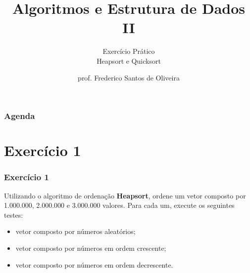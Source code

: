 \documentclass[aspectratio=169]{beamer}
\title[Algoritmos de Ordenação]{Algoritmos e Estrutura de Dados II}
\subtitle{Exercício Prático\\Heapsort e Quicksort}
\author[Frederico Santos de Oliveira]{prof. Frederico Santos de Oliveira}
\institute[UFMT]{Universidade Federal de Mato Grosso\\ Instituto de Engenharia}
\date{}
\begin{document}

\begin{frame}[plain]
  \titlepage
\end{frame}


\begin{frame}
  \frametitle{Agenda}
  \tableofcontents
\end{frame}

\section{Exercício 1}

\begin{frame}
\frametitle{Exercício 1}
Utilizando o algoritmo de ordenação {\bf Heapsort}, ordene um vetor composto por 1.000.000, 2.000.000 e 3.000.000 valores. Para cada um, execute os seguintes testes:
\begin{itemize}
 \item vetor composto por números aleatórios;
 \item vetor composto por números em ordem crescente;
 \item vetor composto por números em ordem decrescente.
\end{itemize} 
\end{frame}

\end{document}
